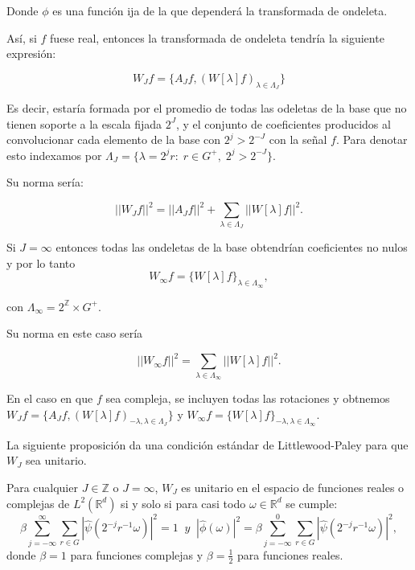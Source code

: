 \medskip

\noindent Donde $\phi$ es una función ija de la que dependerá la transformada de ondeleta.

\medskip

\noindent Así, si $f$ fuese real, entonces la transformada de ondeleta tendría la siguiente expresión: 

$$W_J f=\lbrace A_Jf,(W[\lambda]f)_{\lambda \in \Lambda_J} \rbrace$$ 

\noindent Es decir, estaría formada por el promedio de todas las odeletas de la base que no tienen soporte a la escala fijada $2^J$, y el conjunto de coeficientes producidos al convolucionar cada elemento de la base con $2^j>2^{-J}$ con la señal $f$. Para denotar esto indexamos por $\Lambda_J=\lbrace \lambda=2^jr:\;r\in G^{+}, \; 2^j>2^{-J}\rbrace$. 

\medskip

\noindent Su norma sería: 

\begin{equation} \label{eq::norma}
  ||W_Jf||^2=||A_Jf||^2+\sum_{\lambda \in \Lambda_J} ||W[\lambda]f||^2.
\end{equation}

\medskip
 
\noindent Si $J=\infty$ entonces todas las ondeletas de la base obtendrían coeficientes no nulos y por lo tanto 
$$W_\infty f=\lbrace W[\lambda]f\rbrace_{\lambda \in \Lambda_\infty},$$ 

\noindent con $\Lambda_\infty=2^\mathbb{Z} \times G^{+}$. 

\noindent Su norma en este caso sería 

$$||W_\infty f||^2=\sum_{\lambda \in \Lambda_\infty} ||W[\lambda]f||^2.$$

\noindent En el caso en que $f$ sea compleja, se incluyen todas las rotaciones y obtnemos $W_Jf=\lbrace A_J f,(W[\lambda]f)_{-\lambda,\lambda \in \Lambda_J} \rbrace$ y $W_\infty f=\lbrace W[\lambda]f\rbrace_{-\lambda,\lambda \in \Lambda_\infty}$. 

\medskip

\noindent La siguiente proposición da una condición estándar de Littlewood-Paley para que $W_J$ sea unitario.

\begin{proposicion} \label{unitario}
 Para cualquier $J \in \mathbb{Z}$ o $J=\infty$, $W_J$ es unitario en el espacio de funciones reales o complejas de $L^2(\mathbb{R}^d)$ si y solo si para casi todo $\omega \in \mathbb{R}^d$ se cumple: 
    \begin{equation}\label{eq::1.2}
        \beta \sum_{j=-\infty}^\infty \sum_{r \in G} |\widehat{\psi}(2^{-j}r^{-1}\omega)|^2=1 \; \; y
        \;\;|\widehat{\phi}(\omega)|^2= \beta \sum_{j=-\infty}^0 \sum_{r\in G} |\widehat{\psi}(2^{-j}r^{-1}\omega)|^2,
    \end{equation}
 donde $\beta=1$ para funciones complejas y $\beta=\frac{1}{2}$ para funciones reales.
\end{proposicion}

